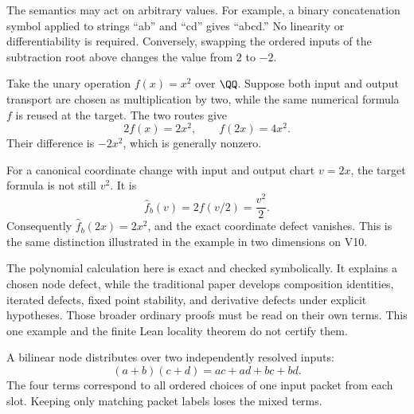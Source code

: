 The semantics may act on arbitrary values. For example, a binary concatenation symbol applied to strings ``ab'' and ``cd'' gives ``abcd.'' No linearity or differentiability is required. Conversely, swapping the ordered inputs of the subtraction root above changes the value from $2$ to $-2$.


Take the unary operation $f(x)=x^2$ over $\QQ$. Suppose both input and output transport are chosen as multiplication by two, while the same numerical formula $f$ is reused at the target. The two routes give
\[
2f(x)=2x^2,\qquad f(2x)=4x^2.
\]
Their difference is $-2x^2$, which is generally nonzero.


For a canonical coordinate change with input and output chart $v=2x$, the target formula is not still $v^2$. It is
\[
\widehat f_b(v)=2f(v/2)=\frac{v^2}{2}.
\]
Consequently $\widehat f_b(2x)=2x^2$, and the exact coordinate defect vanishes. This is the same distinction illustrated in the example in two dimensions on V10.

The polynomial calculation here is exact and checked symbolically. It explains a chosen node defect, while the traditional paper develops composition identities, iterated defects, fixed point stability, and derivative defects under explicit hypotheses. Those broader ordinary proofs must be read on their own terms. This one example and the finite Lean locality theorem do not certify them.


A bilinear node distributes over two independently resolved inputs:
\[
(a+b)(c+d)=ac+ad+bc+bd.
\]
The four terms correspond to all ordered choices of one input packet from each slot. Keeping only matching packet labels loses the mixed terms.

